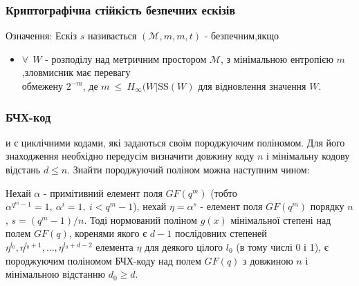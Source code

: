 \documentclass[11pt]{article}
\providecommand{\tightlist}{%
      \setlength{\itemsep}{0pt}\setlength{\parskip}{0pt}}
\begin{document}
    \hypertarget{ux43aux440ux438ux43fux442ux43eux433ux440ux430ux444ux456ux447ux43dux430-ux441ux442ux456ux439ux43aux456ux441ux442ux44c-ux431ux435ux437ux43fux435ux447ux43dux438ux445-ux435ux441ux43aux456ux437ux456ux432}{%
\subsubsection{Криптографічна стійкість безпечних
ескізів}\label{ux43aux440ux438ux43fux442ux43eux433ux440ux430ux444ux456ux447ux43dux430-ux441ux442ux456ux439ux43aux456ux441ux442ux44c-ux431ux435ux437ux43fux435ux447ux43dux438ux445-ux435ux441ux43aux456ux437ux456ux432}}

Означення: Ескіз \(s\) називається
\((\mathcal{M},m,\overset{\text{~}}{m},t)\) - безпечним,якщо

\begin{itemize}
\tightlist
\item
  \(\forall ~~ W\) - розподілу над метричним простором \(\mathcal{M}\),
  з мінімальною ентропією \(m\),зловмисник має перевагу\\
  обмежену \(2^{-\overset{\text{~}}{m}}\), де
  \(\overset{\text{~}}{m}~\leq~\overset{\text{~}}{H}_{\infty}(W| \text{SS}(W)\)
  для відновлення значення \(W\).
\end{itemize}

    \hypertarget{ux431ux447ux445-ux43aux43eux434}{%
\subsubsection{БЧХ-код}\label{ux431ux447ux445-ux43aux43eux434}}

и є циклічними кодами, які задаються своїм породжуючим поліномом. Для
його знаходження необхідно передусім визначити довжину коду
\({\displaystyle n}\) і мінімальну кодову відстань
\({\displaystyle d\leqslant n}\). Знайти породжуючий поліном можна
наступним чином:

Нехай \({\displaystyle \alpha }\) - примітивний елемент поля
\({\displaystyle GF(q^{m})}\) (тобто
\({\displaystyle \alpha ^{q^{m}-1}=1,\ \alpha ^{i} = 1,\ i<q^{m}-1}\)),
нехай \({\displaystyle \eta =\alpha ^{s}}\) - елемент поля
\({\displaystyle GF(q^{m})}\) порядку \({\displaystyle n}\),
\({\displaystyle s=(q^{m}-1)/n}\). Тоді нормований поліном
\({\displaystyle g(x)}\) мінімальної степені над полем
\({\displaystyle GF(q)}\), коренями якого є \({\displaystyle d-1}\)
послідовних степеней
\({\displaystyle \eta ^{l_{0}},\eta ^{l_{0}+1},\ldots ,\eta ^{l_{0}+d-2}}\)
елемента \({\displaystyle \eta }\) для деякого цілого
\({\displaystyle l_{0}}\) (в тому числі 0 і 1), є породжуючим поліномом
БЧХ-коду над полем \({\displaystyle GF(q)}\) з довжиною
\({\displaystyle n}\) і мінімальною відстанню
\({\displaystyle d_{0}\geqslant d}\).
\end{document}
